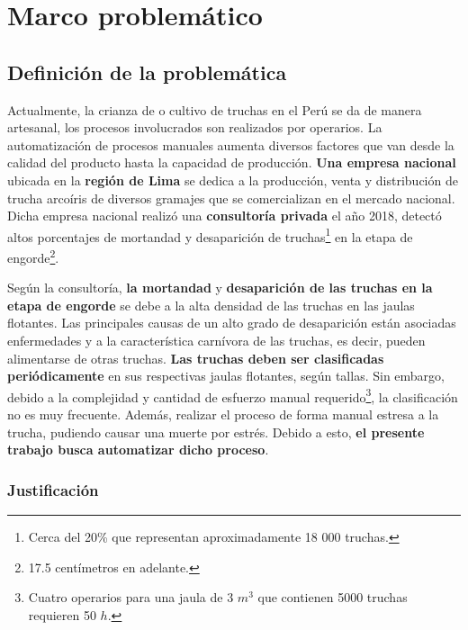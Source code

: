 

\doublespacing
\chapter{Marco problemático}
\section{Definición de la problemática}


Actualmente, la crianza de o cultivo de truchas en el Perú se da de manera artesanal, los procesos involucrados son realizados por operarios. La automatización de procesos manuales aumenta diversos factores que van desde la calidad del producto hasta la capacidad de producción. \textbf{Una empresa nacional} ubicada en la \textbf{región de Lima} se dedica a la producción, venta y distribución de trucha arcoíris de diversos gramajes que se comercializan en el mercado nacional. Dicha empresa nacional realizó una \textbf{consultoría privada} el año 2018, detectó altos porcentajes de mortandad y desaparición de truchas\footnote{Cerca del 20\% que representan aproximadamente 18 000 truchas.} en la etapa de engorde\footnote{17.5 centímetros en adelante.}.

Según la consultoría, \textbf{la mortandad} y \textbf{desaparición de las truchas en la etapa de engorde} se debe a la alta densidad de las truchas en las jaulas flotantes. Las principales causas de un alto grado de desaparición están asociadas enfermedades y a la característica carnívora de las truchas, es decir, pueden alimentarse de otras truchas. \textbf{Las truchas deben ser clasificadas periódicamente} en sus respectivas jaulas flotantes, según tallas. Sin embargo, debido a la complejidad y cantidad de esfuerzo manual requerido\footnote{Cuatro operarios para una jaula de 3 $ m^3 $ que contienen 5000 truchas requieren 50 $ h $.}, la clasificación no es muy frecuente. Además, realizar el proceso de forma manual estresa a la trucha, pudiendo causar una muerte por estrés. Debido a esto, \textbf{el presente trabajo busca automatizar dicho proceso}.

\subsection{Justificación}

